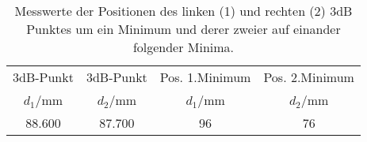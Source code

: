 \begin{table}[!h]
	\centering
	\begin{tabular}{cccc}
		\toprule
		3dB-Punkt & 3dB-Punkt & Pos. 1.Minimum & Pos. 2.Minimum\\
		$d_1$/\si{mm} & $d_2$/\si{mm} & $d_1$/\si{mm} & $d_2$/\si{mm}\\
\midrule
		\num{88.600} & \num{87.700} & \num{96} & \num{76}\\
		\bottomrule
	\end{tabular}
	\caption{ Messwerte der Positionen des linken (1) und rechten (2) 3dB Punktes um ein Minimum
                    und derer zweier auf einander folgender Minima. \label{tab:SWR_3dB_Methode}}
\end{table}
